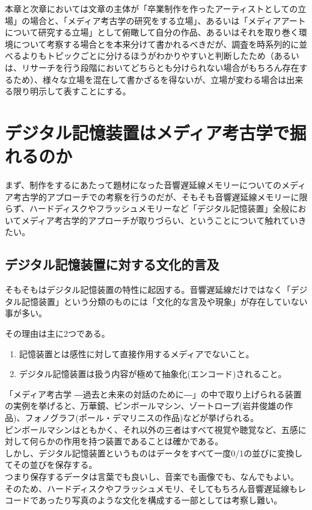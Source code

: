 本章と次章においては文章の主体が「卒業制作を作ったアーティストとしての立場」の場合と、「メディア考古学の研究をする立場」、あるいは「メディアアートについて研究する立場」として俯瞰して自分の作品、あるいはそれを取り巻く環境について考察する場合とを本来分けて書かれるべきだが、調査を時系列的に並べるよりもトピックごとに分けるほうがわかりやすいと判断したため（あるいは、リサーチを行う段階においてどちらとも分けられない場合がもちろん存在するため）、様々な立場を混在して書かざるを得ないが、立場が変わる場合は出来る限り明示して表すことにする。

\section{デジタル記憶装置はメディア考古学で掘れるのか}\label{ux30c7ux30b8ux30bfux30ebux8a18ux61b6ux88c5ux7f6eux306fux30e1ux30c7ux30a3ux30a2ux8003ux53e4ux5b66ux3067ux6398ux308cux308bux306eux304b}

まず、制作をするにあたって題材になった音響遅延線メモリーについてのメディア考古学的アプローチでの考察を行うのだが、そもそも音響遅延線メモリーに限らず、ハードディスクやフラッシュメモリーなど「デジタル記憶装置」全般においてメディア考古学的アプローチが取りづらい、ということについて触れていきたい。

\subsection{デジタル記憶装置に対する文化的言及}\label{ux30c7ux30b8ux30bfux30ebux8a18ux61b6ux88c5ux7f6eux306bux5bfeux3059ux308bux6587ux5316ux7684ux8a00ux53ca}

そもそもはデジタル記憶装置の特性に起因する。音響遅延線だけではなく「デジタル記憶装置」という分類のものには「文化的な言及や現象」が存在していない事が多い。

その理由は主に2つである。

\begin{enumerate}
\def\labelenumi{\arabic{enumi}.}
\tightlist
\item
  記憶装置とは感性に対して直接作用するメディアでないこと。
\item
  デジタル記憶装置は扱う内容が極めて抽象化(エンコード)されること。
\end{enumerate}

「メディア考古学
―過去と未来の対話のために―」の中で取り上げられる装置の実例を挙げると、万華鏡、ピンボールマシン、ゾートロープ(岩井俊雄の作品)、フォノグラフ(ポール・デマリニスの作品)などが挙げられる。\\
ピンボールマシンはともかく、それ以外の三者はすべて視覚や聴覚など、五感に対して何らかの作用を持つ装置であることは確かである。\\
しかし、デジタル記憶装置というものはデータをすべて一度0/1の並びに変換してその並びを保存する。\\
つまり保存するデータは言葉でも良いし、音楽でも画像でも、なんでもよい。\\
そのため、ハードディスクやフラッシュメモリ、そしてもちろん音響遅延線もレコードであったり写真のような文化を構成する一部としては考察し難い。

